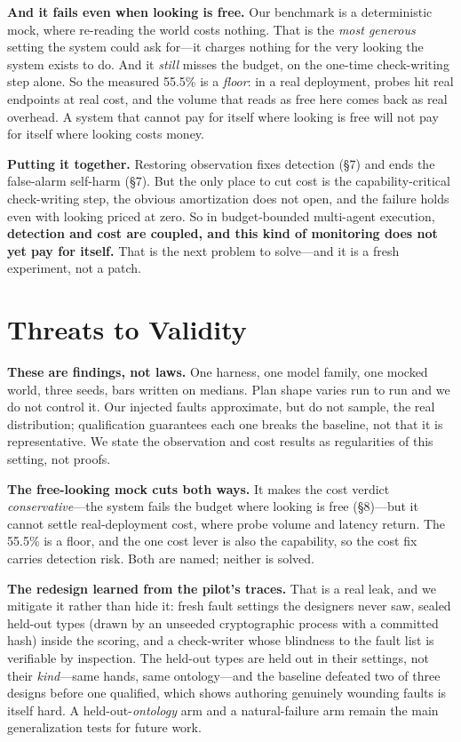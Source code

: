 \documentclass[acmsmall,screen]{acmart}
\begin{document}
\textbf{And it fails even when looking is free.} Our benchmark is a
deterministic mock, where re-reading the world costs nothing. That is the
\emph{most generous} setting the system could ask for---it charges nothing for
the very looking the system exists to do. And it \emph{still} misses the budget,
on the one-time check-writing step alone. So the measured 55.5\% is a
\emph{floor}: in a real deployment, probes hit real endpoints at real cost, and
the volume that reads as free here comes back as real overhead. A system that
cannot pay for itself where looking is free will not pay for itself where
looking costs money.

\textbf{Putting it together.} Restoring observation fixes detection (\S7) and
ends the false-alarm self-harm (\S7). But the only place to cut cost is the
capability-critical check-writing step, the obvious amortization does not open,
and the failure holds even with looking priced at zero. So in budget-bounded
multi-agent execution, \textbf{detection and cost are coupled, and this kind of
monitoring does not yet pay for itself.} That is the next problem to solve---and
it is a fresh experiment, not a patch.

\section{Threats to Validity}
\textbf{These are findings, not laws.} One harness, one model family, one mocked
world, three seeds, bars written on medians. Plan shape varies run to run and we
do not control it. Our injected faults approximate, but do not sample, the real
distribution; qualification guarantees each one breaks the baseline, not that it
is representative. We state the observation and cost results as regularities of
this setting, not proofs.

\textbf{The free-looking mock cuts both ways.} It makes the cost verdict
\emph{conservative}---the system fails the budget where looking is free
(\S8)---but it cannot settle real-deployment cost, where probe volume and
latency return. The 55.5\% is a floor, and the one cost lever is also the
capability, so the cost fix carries detection risk. Both are named; neither is
solved.

\textbf{The redesign learned from the pilot's traces.} That is a real leak, and
we mitigate it rather than hide it: fresh fault settings the designers never
saw, sealed held-out types (drawn by an unseeded cryptographic process with a
committed hash) inside the scoring, and a check-writer whose blindness to the
fault list is verifiable by inspection. The held-out types are held out in their
settings, not their \emph{kind}---same hands, same ontology---and the baseline
defeated two of three designs before one qualified, which shows authoring
genuinely wounding faults is itself hard. A held-out-\emph{ontology} arm and a
natural-failure arm remain the main generalization tests for future work.
\end{document}
